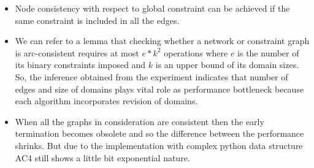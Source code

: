 \documentclass[10pt,twocolumn]{article}
\begin{document}
\begin{itemize}
	\item Node consistency with respect to global constraint can be achieved if the same constraint is included in all the edges. 
	\item We can refer to a lemma that checking whether a network or constraint graph is arc-consistent requires at most $ e * k^{2} $ operations where $ e $ is the number of its binary constraints imposed and $ k $ is an upper bound of its domain sizes. So, the inference obtained from the experiment indicates that number of edges and size of domains plays vital role as performance bottleneck because each algorithm incorporates revision of domains.
	\item When all the graphs in consideration are consistent then the early termination becomes obsolete and so the difference between the performance shrinks. But due to the implementation with complex python data structure AC4 still shows a little bit exponential nature.
\end{itemize}
\end{document}
